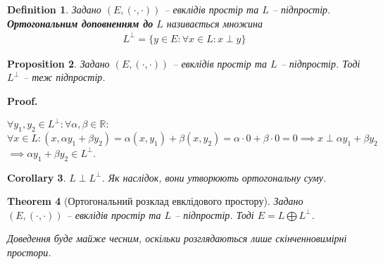 \documentclass[a4paper, 10pt]{article}
\makeatletter
\theoremstyle{theoremdd}
\newtheorem{theorem}{Theorem}[subsection]
\newtheorem{definition}[theorem]{Definition}
\newtheorem{proposition}[theorem]{Proposition}
\newtheorem{corollary}[theorem]{Corollary}
\renewenvironment{proof}[1][Proof.\\]{\par
\pushQED{\hfill \qed}%
\normalfont \topsep6\p@\@plus6\p@\relax
\trivlist
\item\relax
{\bfseries
#1\@addpunct{.}}\hspace\labelsep\ignorespaces
}{%
\popQED\endtrivlist\@endpefalse
}
\makeatother
\begin{document}
\begin{definition}
Задано $(E, (\cdot,\cdot))$ -- евклідів простір та $L$ -- підпростір.\\
\textbf{Ортогональним доповненням до} $L$ називається множина
\begin{align*}
L^{\perp} = \{y \in E: \forall x \in L: x \perp y\}
\end{align*}
\end{definition}

\begin{proposition}
Задано $(E, (\cdot,\cdot))$ -- евклідів простір та $L$ -- підпростір. Тоді $L^{\perp}$ -- теж підпростір.
\end{proposition}

\begin{proof}
$\forall y_1,y_2 \in L^{\perp}: \forall \alpha,\beta \in \mathbb{R}:$\\
$\forall x \in L: (x, \alpha y_1+ \beta y_2) = \alpha (x,y_1) + \beta (x,y_2) = \alpha \cdot 0 + \beta \cdot 0 = 0 \implies x \perp \alpha y_1 + \beta y_2$\\
$\implies \alpha y_1 + \beta y_2 \in L^{\perp}$.
\end{proof}

\begin{corollary}
$L \perp L^\perp$. Як наслідок, вони утворюють ортогональну суму.
\end{corollary}

\begin{theorem}[Ортогональний розклад евклідового простору]
Задано $(E, (\cdot,\cdot))$ -- евклідів простір та $L$ -- підпростір.
Тоді $E = L \bigoplus L^{\perp}$.
\end{theorem}
\noindent
\textit{Доведення буде майже чесним, оскільки розглядаються лише скінченновимірні простори.}
\end{document}
